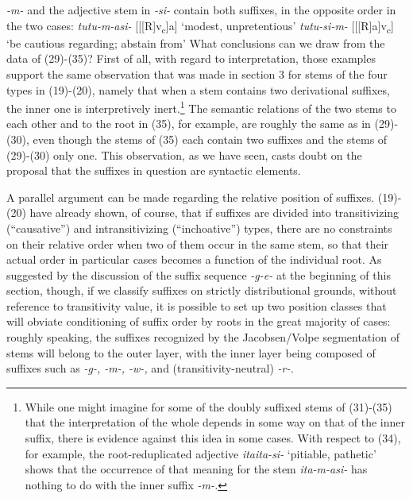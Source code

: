 \documentclass[output=paper,
modfonts
]{LSP/langsci}
\begin{document}
\textit{-m-} and the adjective stem in \textit{-si-} contain both suffixes,
in the opposite order in the two cases:
\ea
	\ea \textit{tutu-m-asi-} {[}{[}{[}R{]}v\textsubscript{c}{]}a{]} `modest, unpretentious'
	\ex \textit{tutu-si-m-} {[}{[}{[}R{]}a{]}v\textsubscript{c}{]} `be cautious regarding; abstain from'
	\z
\z
What conclusions can we draw from the data of (29)-(35)? First of all,
with regard to interpretation, those examples support the same
observation that was made in section 3 for stems of the four types in
(19)-(20), namely that when a stem contains two derivational suffixes,
the inner one is interpretively inert.\footnote{While one might imagine
  for some of the doubly suffixed stems of (31)-(35) that the
  interpretation of the whole depends in some way on that of the inner
  suffix, there is evidence against this idea in some cases. With
  respect to (34), for example, the root-reduplicated adjective
  \textit{itaita-si-} `pitiable, pathetic' shows that the occurrence of
  that meaning for the stem \textit{ita-m-asi-} has nothing to do with the
  inner suffix \textit{-m-.}} The semantic relations of the two stems to
each other and to the root in (35), for example, are roughly the same as
in (29)-(30), even though the stems of (35) each contain two suffixes
and the stems of (29)-(30) only one. This observation, as we have seen,
casts doubt on the proposal that the suffixes in question are syntactic
elements.

A parallel argument can be made regarding the relative position of
suffixes. (19)-(20) have already shown, of course, that if suffixes are
divided into transitivizing (``causative'') and intransitivizing
(``inchoative'') types, there are no constraints on their relative order
when two of them occur in the same stem, so that their actual order in
particular cases becomes a function of the individual root. As suggested
by the discussion of the suffix sequence \textit{-g-e-} at the beginning
of this section, though, if we classify suffixes on strictly
distributional grounds, without reference to transitivity value, it is
possible to set up two position classes that will obviate conditioning
of suffix order by roots in the great majority of cases: roughly
speaking, the suffixes recognized by the Jacobsen/Volpe segmentation of
stems will belong to the outer layer, with the inner layer being
composed of suffixes such as \textit{-g-, -m-, -w-,} and
(transitivity-neutral) \textit{-r-.}
\end{document}
